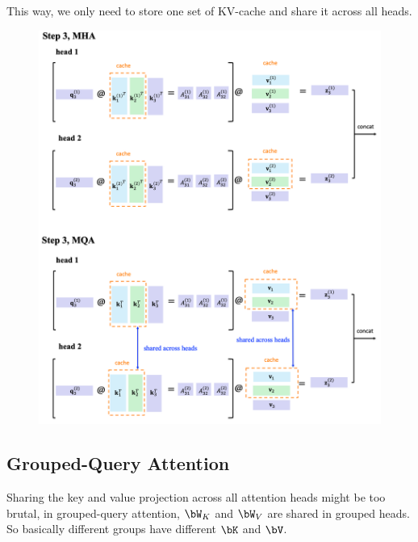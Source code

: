 \documentclass{article}
\begin{document}
This way, we only need to store one set of KV-cache and share it across all heads.
\begin{figure}[!h]
	\centering
	\includegraphics[scale=0.43]{imgs/MQA.png}
\end{figure}

\subsection{Grouped-Query Attention}
Sharing the key and value projection across all attention heads might be too brutal, in grouped-query attention, $\bW_K$ and $\bW_V$ are shared in grouped heads.
So basically different groups have different $\bK$ and $\bV$.
\end{document}
